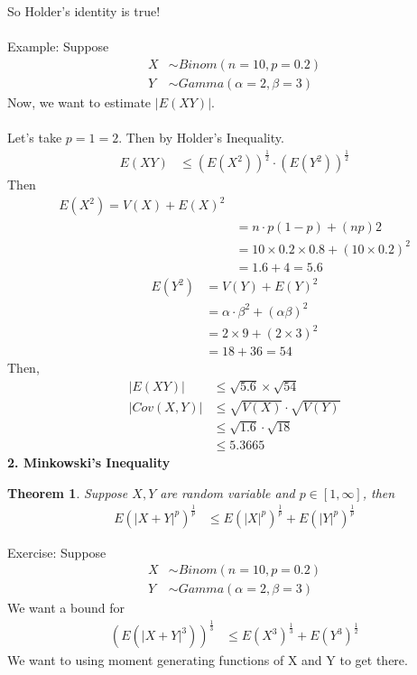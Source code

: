\documentclass[11pt,oneside]{book}
\theoremstyle{break}
\theoremstyle{break}
\newtheorem{thm}{Theorem}[section]
\newcommand{\example}{\color{WildStrawberry}Example: \color{black}}
\newcommand{\exercise}{\color{CadetBlue}Exercise: \color{black}}
\begin{document}
So Holder's identity is true!\\
\hfill\\
\example Suppose \begin{align*}
X&\sim Binom(n=10,p=0.2)\\
Y&\sim Gamma(\alpha=2, \beta=3)
\end{align*}
Now, we want to estimate $|E(XY)|$. \\
\hfill\\
Let's take $p=1=2$. Then by Holder's Inequality. \begin{align*}
E(XY)&\leq (E(X^2))^{\frac{1}{2}}\cdot (E(Y^2))^{\frac{1}{2}}
\end{align*}
Then \begin{align*}
E(X^2)=V(X)+E(X)^2\\
&=n\cdot p(1-p)+(np)2\\
&=10\times 0.2\times 0.8+(10\times 0.2)^2\\
&=1.6+4=5.6
\end{align*}\begin{align*}
E(Y^2)&=V(Y)+E(Y)^2\\
&=\alpha \cdot \beta^2+(\alpha \beta)^2\\
&=2\times 9 +(2\times 3)^2\\
&=18+36 =54
\end{align*}
Then, \begin{align*}
|E(XY)|&\leq \sqrt{5.6}\times \sqrt{54}\\
|Cov(X,Y)|&\leq \sqrt{V(X)}\cdot \sqrt{V(Y)}\\
&\leq \sqrt{1.6}\cdot\sqrt{18}\\
&\leq 5.3665
\end{align*}
\textbf{2. Minkowski's Inequality}\\
\begin{thm}
Suppose $X,Y$ are random variable and $p\in [1,\infty]$, then \begin{align*}
E(|X+Y|^p)^{\frac{1}{p}}&\leq E(|X|^p)^{\frac{1}{p}}+E(|Y|^p)^{\frac{1}{p}}
\end{align*}
\end{thm}
\exercise Suppose \begin{align*}
X&\sim Binom(n=10,p=0.2)\\
Y&\sim Gamma(\alpha =2,\beta =3) 
\end{align*}
We want a bound for \begin{align*}
\left(E(|X+Y|^3)\right)^{\frac{1}{3}}&\leq E(X^3)^{\frac{1}{3}}+E(Y^3)^{\frac{1}{2}}
\end{align*}
We want to using moment generating functions of X and Y to get there. 
\end{document}
